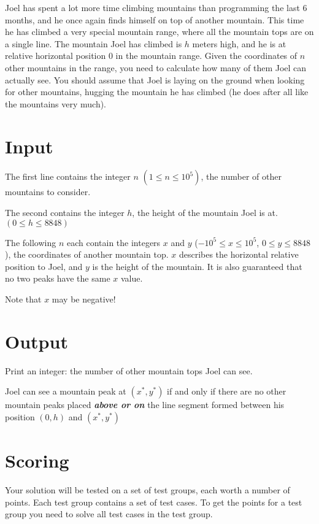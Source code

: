 \noindent


Joel has spent a lot more time climbing mountains than programming the last 6 months, and he once again finds himself on top of another mountain.
This time he has climbed a very special mountain range, where all the mountain tops are on a single line. 
The mountain Joel has climbed is $h$ meters high, and he is at relative horizontal position $0$ in the mountain range.
Given the coordinates of $n$ other mountains in the range, you need to calculate how many of them Joel can actually see.
You should assume that Joel is laying on the ground when looking for other mountains, hugging the mountain he has climbed (he does after all like the mountains very much).

\section*{Input}
The first line contains the integer $n$ $(1 \leq n \leq 10^{5})$, the number of other mountains to consider. 

The second contains the integer $h$, the height of the mountain Joel is at. $(0 \leq h \leq 8848)$

The following $n$ each contain the integers $x$ and $y$ ($-10^{5} \leq x \leq 10^{5}$, $0 \leq y \leq 8848$), the coordinates of another mountain top.
$x$ describes the horizontal relative position to Joel, and $y$ is the height of the mountain. It is also guaranteed that no two peaks have the same $x$ value.

Note that $x$ may be negative!

\section*{Output}
Print an integer: the number of other mountain tops Joel can see. 

Joel can see a mountain peak at $(x^*, y^*)$ if and only if there are no other mountain peaks placed \textbf{\emph{above or on}} the line segment formed between his position $(0, h)$ and $(x^*, y^*)$

\section*{Scoring}
Your solution will be tested on a set of test groups, each worth a number of points. Each test group contains
a set of test cases. To get the points for a test group you need to solve all test cases in the test group.

